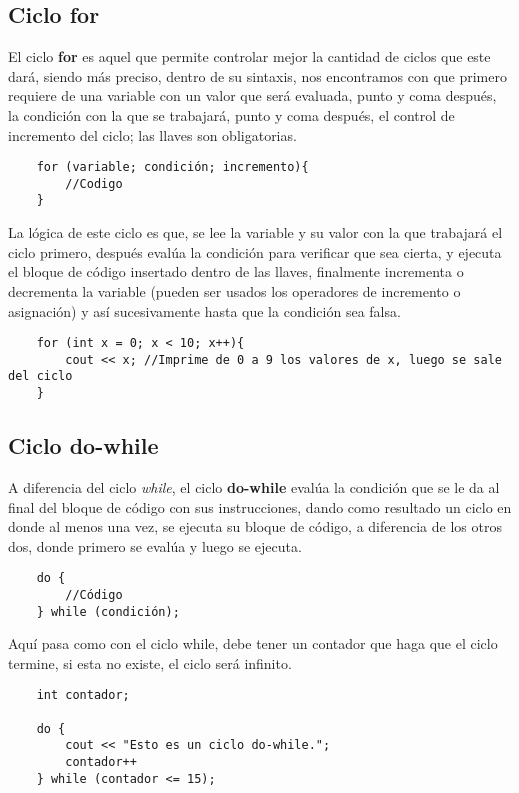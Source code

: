 \subsection{Ciclo for}
El ciclo \textbf{for} es aquel que permite controlar mejor la cantidad de ciclos que este dará, siendo más preciso, dentro de su sintaxis, nos encontramos con que primero requiere de una variable con un valor que será evaluada, punto y coma después, la condición con la que se trabajará, punto y coma después, el control de incremento del ciclo; las llaves son obligatorias.
\begin{lstlisting}
    for (variable; condición; incremento){
        //Codigo
    }
\end{lstlisting}
La lógica de este ciclo es que, se lee la variable y su valor con la que trabajará el ciclo primero, después evalúa la condición para verificar que sea cierta, y ejecuta el bloque de código insertado dentro de las llaves, finalmente incrementa o decrementa la variable (pueden ser usados los operadores de incremento o asignación) y así sucesivamente hasta que la condición sea falsa.
\begin{lstlisting}
    for (int x = 0; x < 10; x++){
        cout << x; //Imprime de 0 a 9 los valores de x, luego se sale del ciclo
    }
\end{lstlisting}

\subsection{Ciclo do-while}
A diferencia del ciclo \textit{while}, el ciclo \textbf{do-while} evalúa la condición que se le da al final del bloque de código con sus instrucciones, dando como resultado un ciclo en donde al menos una vez, se ejecuta su bloque de código, a diferencia de los otros dos, donde primero se evalúa y luego se ejecuta.
\begin{lstlisting}
    do {
        //Código
    } while (condición);
\end{lstlisting}
Aquí pasa como con el ciclo while, debe tener un contador que haga que el ciclo termine, si esta no existe, el ciclo será infinito.
\begin{lstlisting}
    int contador;
    
    do {
        cout << "Esto es un ciclo do-while.";
        contador++
    } while (contador <= 15);
\end{lstlisting}



